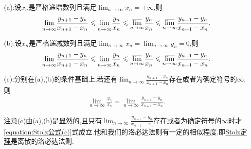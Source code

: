 \documentclass[lang=cn,newtx,10pt,scheme=chinese]{elegantbook}
\begin{document}
\begin{theorem}[Stolz定理]\label{theorem:Stolz定理}
(a):设\(x_n\)是严格递增数列且满足\(\lim_{n \to \infty} x_n = +\infty\),则
\begin{align*}
\underset{n\rightarrow \infty}{{\varliminf }} \frac{y_{n + 1} - y_n}{x_{n + 1} - x_n} \leqslant \underset{n\rightarrow \infty}{{\varliminf }} \frac{y_n}{x_n} \leqslant \underset{n\rightarrow \infty}{{\varlimsup }} \frac{y_n}{x_n} \leqslant \underset{n\rightarrow \infty}{{\varlimsup }} \frac{y_{n + 1} - y_n}{x_{n + 1} - x_n}.
\end{align*}

(b):设\(x_n\)是严格递减数列且满足\(\lim_{n \to \infty} x_n = \lim_{n \to \infty} y_n = 0\),则
\begin{align*}
\underset{n\rightarrow \infty}{{\varliminf }} \frac{y_{n + 1} - y_n}{x_{n + 1} - x_n} \leqslant \underset{n\rightarrow \infty}{{\varliminf }} \frac{y_n}{x_n} \leqslant \underset{n\rightarrow \infty}{{\varlimsup }} \frac{y_n}{x_n} \leqslant \underset{n\rightarrow \infty}{{\varlimsup }} \frac{y_{n + 1} - y_n}{x_{n + 1} - x_n}.
\end{align*}

(c):分别在(a),(b)的条件基础上,若还有\(\lim_{n \to \infty} \frac{y_{n + 1} - y_n}{x_{n + 1} - x_n}\)存在或者为确定符号的\(\infty\),则
\begin{align}\label{equation:Stolz公式(c)}
\lim_{n \to \infty} \frac{y_n}{x_n} = \lim_{n \to \infty} \frac{y_{n + 1} - y_n}{x_{n + 1} - x_n} .
\end{align}
\end{theorem}
\begin{remark}
注意(c)由(a),(b)是显然的,且只有\(\lim_{n \to \infty} \frac{y_{n + 1} - y_n}{x_{n + 1} - x_n}\)存在或者为确定符号的\(\infty\)时才\eqref{equation:Stolz公式(c)}式成立.他和我们的洛必达法则有一定的相似程度.即\hyperref[theorem:Stolz定理]{Stolz定理}是离散的洛必达法则.
\end{remark}
\end{document}
